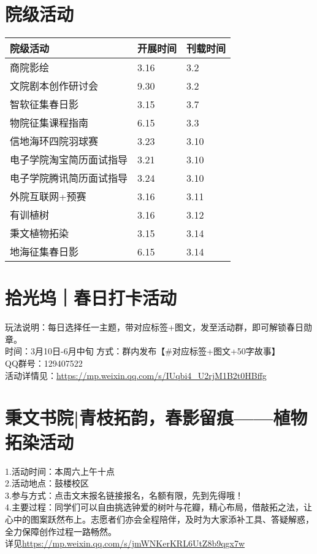 \documentclass[letterpaper, 12pt]{article}
\begin{document}
\begin{multicols}{2}
\section{院级活动}
\begin{tabular}{|>{\centering\arraybackslash}m{}|m{}|m{}|}
    \hline
    院级活动 & 开展时间 & 刊载时间\\
    \hline\hline
    商院影绘 & 3.16 & 3.2\\
    文院剧本创作研讨会 & 9.30 & 3.2\\
    智软征集春日影 & 3.15 & 3.7\\
    物院征集课程指南 & 6.15 & 3.3\\
    信地海环四院羽球赛 & 3.23 & 3.10\\
    电子学院淘宝简历面试指导 & 3.21 & 3.10\\
    电子学院腾讯简历面试指导 & 3.24 & 3.10\\
    外院互联网+预赛 & 3.16 & 3.11\\
    有训植树 & 3.16 & 3.12\\
    秉文植物拓染 & 3.15 & 3.14\\
    地海征集春日影 & 6.15 & 3.14\\
    \hline
\end{tabular}
\section{拾光坞｜春日打卡活动}
玩法说明：每日选择任一主题，带对应标签+图文，发至活动群，即可解锁春日勋章。\\
时间：3月10日-6月中旬 方式：群内发布【\#对应标签+图文+50字故事】\\
QQ群号：129407522\\
活动详情见：\url{https://mp.weixin.qq.com/s/IUqbi4_U2rjM1B2t0HBffg}
\section{秉文书院|青枝拓韵，春影留痕——植物拓染活动}
1.活动时间：本周六上午十点\\
2.活动地点：鼓楼校区\\
3.参与方式：点击文末报名链接报名，名额有限，先到先得哦！\\
4.主要过程：同学们可以自由挑选钟爱的树叶与花瓣，精心布局，借敲拓之法，让心中的图案跃然布上。志愿者们亦会全程陪伴，及时为大家添补工具、答疑解惑，全力保障创作过程一路畅然。\\
详见\url{https://mp.weixin.qq.com/s/jmWNKerKRL6UtZ8b9qgx7w}

\end{multicols}
\end{document}
